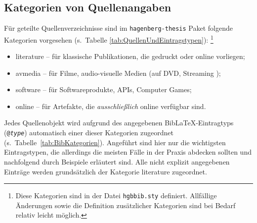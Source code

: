 \subsection{Kategorien von Quellenangaben}
\label{sec:BibKategorien}

Für geteilte Quellenverzeichnisse sind im \texttt{hagenberg-thesis} Paket folgende
Kategorien vorgesehen (s.\ Tabelle \ref{tab:QuellenUndEintragstypen}):%
\footnote{Diese Kategorien sind in der Datei \nolinkurl{hgbbib.sty} definiert.
Allfällige Änderungen sowie die Definition zusätzlicher Kategorien sind bei
Bedarf relativ leicht möglich.}
%
\begin{itemize}
    \item[] \textsf{literature} -- für klassische Publikationen, die gedruckt
    oder online vorliegen;
    \item[] \textsf{avmedia} -- für Filme, audio-visuelle Medien (auf DVD,
    Streaming \usw);
    \item[] \textsf{software} -- für Softwareprodukte, APIs, Computer Games;
    \item[] \textsf{online} -- für Artefakte, die \emph{ausschließlich}
    online verfügbar sind.
\end{itemize}
%
Jedes Quellenobjekt wird aufgrund des angegebenen BibLaTeX-Eintragtyps
(\texttt{@\emph{type}}) automatisch einer dieser Kategorien zugeordnet (s.\
Tabelle~\ref{tab:BibKategorien}). Angeführt sind hier nur die wichtigsten
Eintragstypen, die allerdings die meisten Fälle in der Praxis abdecken
sollten und nachfolgend durch Beispiele erläutert sind. Alle nicht explizit
angegebenen Einträge werden grundsätzlich der Kategorie \textsf{literature}
zugeordnet.

